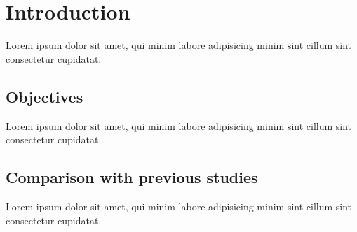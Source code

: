 \chapter{Introduction}
\label{chap:introduction}
Lorem ipsum dolor sit amet, qui minim labore adipisicing minim sint cillum sint consectetur cupidatat.

\section{Objectives}

Lorem ipsum dolor sit amet, qui minim labore adipisicing minim sint cillum sint consectetur cupidatat.

\section{Comparison with previous studies}

Lorem ipsum dolor sit amet, qui minim labore adipisicing minim sint cillum sint consectetur cupidatat.
